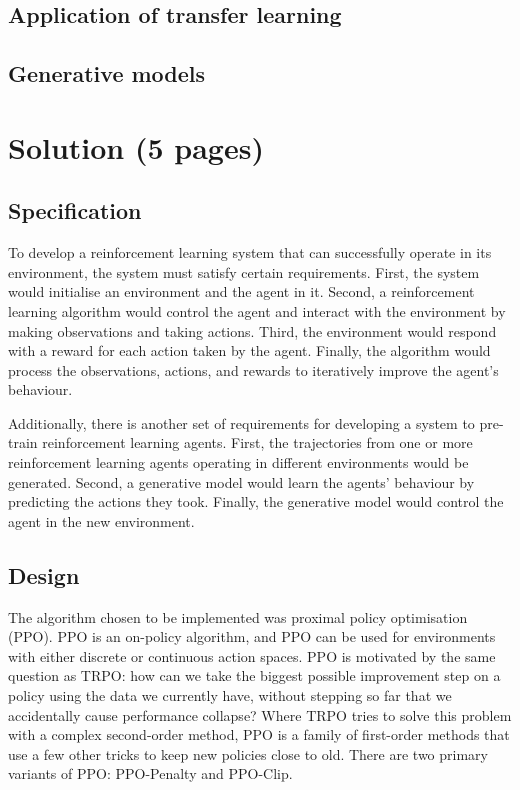 \documentclass[12pt,a4paper]{article}
\begin{document}
\subsection{Application of transfer learning }

\subsection{Generative models}

\newpage
\section{Solution (5 pages)}
\subsection{Specification}
To develop a reinforcement learning system that can successfully operate in its environment, the system must satisfy certain requirements. First, the system would initialise an environment and the agent in it. Second, a reinforcement learning algorithm would control the agent and interact with the environment by making observations and taking actions. Third, the environment would respond with a reward for each action taken by the agent. Finally, the algorithm would process the observations, actions, and rewards to iteratively improve the agent's behaviour.  

Additionally, there is another set of requirements for developing a system to pre-train reinforcement learning agents. First, the trajectories from one or more reinforcement learning agents operating in different environments would be generated. Second, a generative model would learn the agents' behaviour by predicting the actions they took. Finally, the generative model would control the agent in the new environment.  

\subsection{Design}
The algorithm chosen to be implemented was proximal policy optimisation (PPO). PPO is an on-policy algorithm, and PPO can be used for environments with either discrete or continuous action spaces. PPO is motivated by the same question as TRPO: how can we take the biggest possible improvement step on a policy using the data we currently have, without stepping so far that we accidentally cause performance collapse? Where TRPO tries to solve this problem with a complex second-order method, PPO is a family of first-order methods that use a few other tricks to keep new policies close to old. There are two primary variants of PPO: PPO-Penalty and PPO-Clip.
\end{document}
